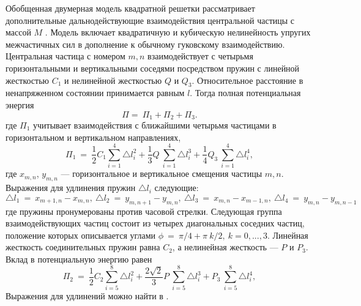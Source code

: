 Обобщенная двумерная модель квадратной решетки рассматривает дополнительные дальнодействующие взаимодействия центральной частицы с массой $M$ \cite{porkros}. Модель включает квадратичную и кубическую нелинейность упругих межчастичных сил в дополнение к обычному гуковскому взаимодействию.
Центральная частица с номером ${m, n}$ взаимодействует с четырьмя горизонтальными и вертикальными соседями посредством пружин с линейной жесткостью $C_1$ и нелинейной жесткостью $Q$ и $Q_3$. Относительное расстояние в ненапряженном состоянии принимается равным $l$. 
Тогда полная потенциальная энергия
\[
\Pi=~\Pi_1+\Pi_2+\Pi_3.
\]
где $\Pi_1 $ учитывает взаимодействия с ближайшими четырьмя частицами в горизонтальном и вертикальном направлениях,
\[
\Pi_1~=~\frac{1}{2} C_1 \sum_{i=1}^{4}\triangle l_i^2+\frac{1}{3} Q~ \sum_{i=1}^{4}\triangle l_i^3+\frac{1}{4} Q_3~ \sum_{i=1}^{4}\triangle l_i^4,
\]
где $x_{m, n}$, $y_{m, n} $ --- горизонтальное и вертикальное смещения частицы $m, n$. Выражения для удлинения пружин $\triangle l_i$ следующие: \cite {porkros}
\[
\triangle l_1~=~x_{m+1,n}-x_{m,n},~ \triangle l_2~=~y_{m,n+1}-y_{m,n},~\triangle l_3~=~x_{m,n}-x_{m-1,n},~ \triangle l_4~=~y_{m,n}-y_{m,n-1}
\]
где пружины пронумерованы против часовой стрелки. Следующая группа взаимодействующих частиц состоит из четырех диагональных соседних частиц, положение которых описывается углами $\phi~=~\pi/4+ \pi~k/2, ~k=0,...,3$. Линейная жесткость соединительных пружин равна $C_2$, а нелинейная жесткость --- $P$ и $P_3$. Вклад в потенциальную энергию равен
\[
\Pi_2~=~\frac{1}{2} C_2 \sum_{i=5}^{8}\triangle l_i^2+\frac{2\sqrt{2}}{3} P~ \sum_{i=5}^{8}\triangle l_i^3+ P_3~ \sum_{i=5}^{8}\triangle l_i^4,
\]
Выражения для удлинений можно найти в \cite {porkros}.


